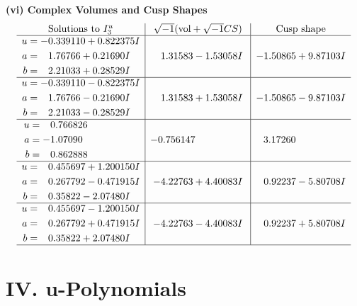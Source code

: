 \documentclass[1p]{elsarticle_modified}
\theoremstyle{definition}
\newcommand{\I}{\sqrt{-1}}
\begin{document}
\newpage\flushleft \textbf{(vi) Complex Volumes and Cusp Shapes}
$$\begin{array}{c|c|c}  
\text{Solutions to }I^u_{3}& \I (\text{vol} + \sqrt{-1}CS) & \text{Cusp shape}\\
 \hline 
\begin{aligned}
u &= -0.339110 + 0.822375 I \\
a &= \phantom{-}1.76766 + 0.21690 I \\
b &= \phantom{-}2.21033 + 0.28529 I\end{aligned}
 & \phantom{-}1.31583 - 1.53058 I & -1.50865 + 9.87103 I \\ \hline\begin{aligned}
u &= -0.339110 - 0.822375 I \\
a &= \phantom{-}1.76766 - 0.21690 I \\
b &= \phantom{-}2.21033 - 0.28529 I\end{aligned}
 & \phantom{-}1.31583 + 1.53058 I & -1.50865 - 9.87103 I \\ \hline\begin{aligned}
u &= \phantom{-}0.766826\phantom{ +0.000000I} \\
a &= -1.07090\phantom{ +0.000000I} \\
b &= \phantom{-}0.862888\phantom{ +0.000000I}\end{aligned}
 & -0.756147\phantom{ +0.000000I} & \phantom{-}3.17260\phantom{ +0.000000I} \\ \hline\begin{aligned}
u &= \phantom{-}0.455697 + 1.200150 I \\
a &= \phantom{-}0.267792 - 0.471915 I \\
b &= \phantom{-}0.35822 - 2.07480 I\end{aligned}
 & -4.22763 + 4.40083 I & \phantom{-}0.92237 - 5.80708 I \\ \hline\begin{aligned}
u &= \phantom{-}0.455697 - 1.200150 I \\
a &= \phantom{-}0.267792 + 0.471915 I \\
b &= \phantom{-}0.35822 + 2.07480 I\end{aligned}
 & -4.22763 - 4.40083 I & \phantom{-}0.92237 + 5.80708 I\\
 \hline 
 \end{array}$$\newpage
\newpage\renewcommand{\arraystretch}{1}
\centering \section*{ IV. u-Polynomials}
\end{document}
